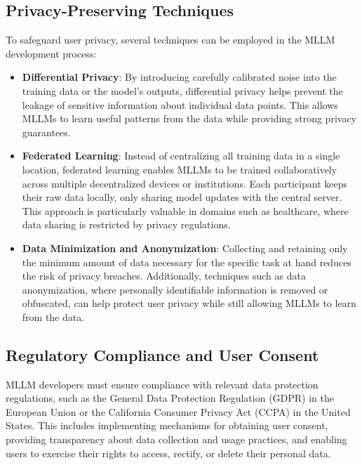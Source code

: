 \subsection{Privacy-Preserving Techniques}

To safeguard user privacy, several techniques can be employed in the MLLM development process:

\begin{itemize}
    \item \textbf{Differential Privacy}: By introducing carefully calibrated noise into the training data or the model's outputs, differential privacy helps prevent the leakage of sensitive information about individual data points. This allows MLLMs to learn useful patterns from the data while providing strong privacy guarantees.
    
    \item \textbf{Federated Learning}: Instead of centralizing all training data in a single location, federated learning enables MLLMs to be trained collaboratively across multiple decentralized devices or institutions. Each participant keeps their raw data locally, only sharing model updates with the central server. This approach is particularly valuable in domains such as healthcare, where data sharing is restricted by privacy regulations.
    
    \item \textbf{Data Minimization and Anonymization}: Collecting and retaining only the minimum amount of data necessary for the specific task at hand reduces the risk of privacy breaches. Additionally, techniques such as data anonymization, where personally identifiable information is removed or obfuscated, can help protect user privacy while still allowing MLLMs to learn from the data.
\end{itemize}

\subsection{Regulatory Compliance and User Consent}

MLLM developers must ensure compliance with relevant data protection regulations, such as the General Data Protection Regulation (GDPR) in the European Union or the California Consumer Privacy Act (CCPA) in the United States. This includes implementing mechanisms for obtaining user consent, providing transparency about data collection and usage practices, and enabling users to exercise their rights to access, rectify, or delete their personal data.

